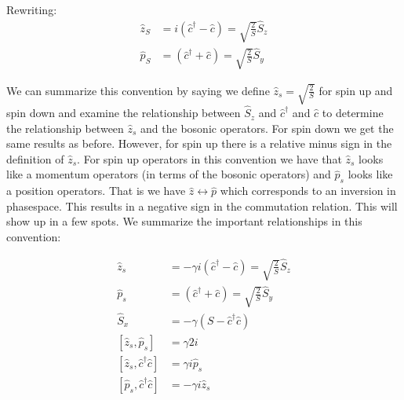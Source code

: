 \documentclass[12pt]{article}
\begin{document}
Rewriting:
\begin{align}
\hat{z}_S &= i(\hat{c}^{\dag} - \hat{c}) = \sqrt{\frac{2}{S}} \hat{S}_z \\
\hat{p}_S &= (\hat{c}^{\dag} + \hat{c}) = \sqrt{\frac{2}{S}} \hat{S}_y 
\end{align}

We can summarize this convention by saying we define $\hat{z}_s = \sqrt{\frac{2}{S}}$ for spin up and spin down and examine the relationship between $\hat{S}_z$ and $\hat{c}^{\dag}$ and $\hat{c}$ to determine the relationship between $\hat{z}_s$ and the bosonic operators.
For spin down we get the same results as before. However, for spin up there is a relative minus sign in the definition of $\hat{z}_s$. For spin up operators in this convention we have that $\hat{z}_s$ looks like a momentum operators (in terms of the bosonic operators) and $\hat{p}_s$ looks like a position operators. That is we have $\hat{z}\leftrightarrow \hat{p}$ which corresponds to an inversion in phasespace. This results in a negative sign in the commutation relation. This will show up in a few spots. We summarize the important relationships in this convention:

\begin{align}
\hat{z}_s &= -\gamma i (\hat{c}^{\dag}-\hat{c}) = \sqrt{\frac{2}{S}} \hat{S}_z \\
\hat{p}_s &= (\hat{c}^{\dag} + \hat{c}) = \sqrt{\frac{2}{S}} \hat{S}_y\\
\hat{S}_x &= -\gamma(S-\hat{c}^{\dag}\hat{c})\\
[\hat{z}_s,\hat{p}_s] &= \gamma 2i\\
[\hat{z}_s,\hat{c}^{\dag}\hat{c}] &= \gamma i \hat{p}_s\\
[\hat{p}_s,\hat{c}^{\dag}\hat{c}] &= -\gamma i \hat{z}_s
\end{align}
\end{document}
